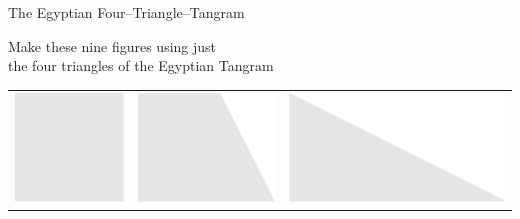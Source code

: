 \documentclass[14pt]{beamer}
\begin{document}
    \begin{frame}{The Egyptian Four--Triangle--Tangram}
        \begin{center}
            Make these nine figures using just\\the four triangles of the Egyptian Tangram

            \bigskip\bigskip

            \begin{tabular}{ccc}
                    \includegraphics[scale=0.3]{figures/figure023a.pdf} \;\;&
                \;\;\includegraphics[scale=0.3]{figures/figure023b.pdf} \;\;&
                \;\;\includegraphics[scale=0.3]{figures/figure023c.pdf} \\[2ex]

\end{tabular}
\end{center}
\end{frame}
\end{document}
